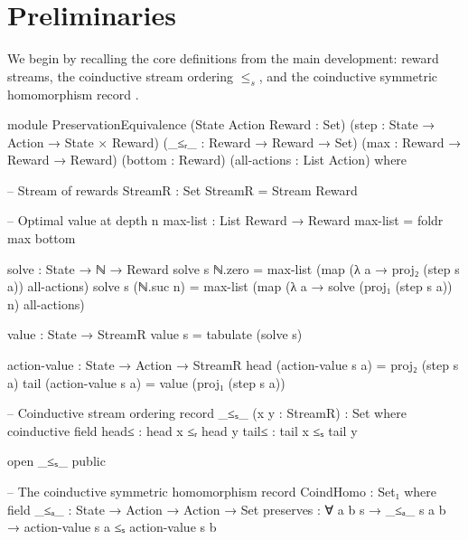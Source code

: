 \documentclass[9pt,a4paper]{article}
\theoremstyle{plain}
\theoremstyle{definition}
\theoremstyle{remark}
\begin{document}
\section{Preliminaries}
\label{sec:prelim}

We begin by recalling the core definitions from the main development: reward streams, the coinductive stream ordering $\le_s$, and the coinductive symmetric homomorphism record .

\begin{code}
module PreservationEquivalence
  (State Action Reward : Set)
  (step                : State → Action → State × Reward)
  (_≤ᵣ_                : Reward → Reward → Set)
  (max                 : Reward → Reward → Reward)
  (bottom              : Reward)
  (all-actions         : List Action)
  where

  -- Stream of rewards
  StreamR : Set
  StreamR = Stream Reward

  -- Optimal value at depth n
  max-list : List Reward → Reward
  max-list = foldr max bottom

  solve : State → ℕ → Reward
  solve s ℕ.zero    = max-list (map (λ a → proj₂ (step s a)) all-actions)
  solve s (ℕ.suc n) = max-list (map (λ a → solve (proj₁ (step s a)) n) all-actions)

  value : State → StreamR
  value s = tabulate (solve s)

  action-value : State → Action → StreamR
  head (action-value s a) = proj₂ (step s a)
  tail (action-value s a) = value (proj₁ (step s a))

  -- Coinductive stream ordering
  record _≤ₛ_ (x y : StreamR) : Set where
    coinductive
    field
      head≤ : head x ≤ᵣ head y
      tail≤ : tail x ≤ₛ tail y

  open _≤ₛ_ public

  -- The coinductive symmetric homomorphism
  record CoindHomo : Set₁ where
    field
      _≤ₐ_      : State → Action → Action → Set
      preserves : ∀ a b s → _≤ₐ_ s a b →
                  action-value s a ≤ₛ action-value s b
\end{code}
\end{document}
